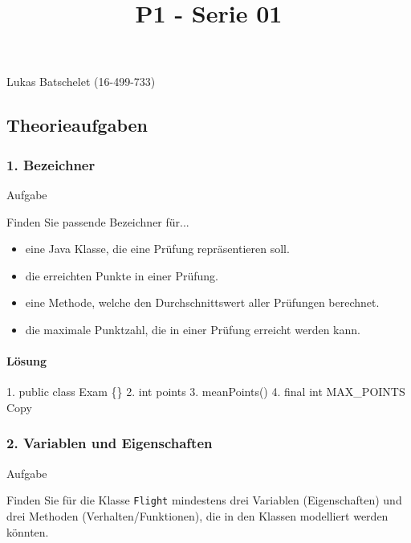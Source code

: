 \documentclass[
]{article}
\title{P1 - Serie 01}
\author{}
\date{}
\newenvironment{Shaded}{}{}
\newcommand{\NormalTok}[1]{#1}
\providecommand{\tightlist}{%
  \setlength{\itemsep}{0pt}\setlength{\parskip}{0pt}}
\begin{document}
\maketitle

Lukas Batschelet (16-499-733)

\subsection{Theorieaufgaben}\label{theorieaufgaben}

\subsubsection{1. Bezeichner}\label{bezeichner}

Aufgabe

Finden Sie passende Bezeichner für...

\begin{itemize}
\tightlist
\item
  eine Java Klasse, die eine Prüfung repräsentieren soll.
\item
  die erreichten Punkte in einer Prüfung.
\item
  eine Methode, welche den Durchschnittswert aller Prüfungen berechnet.
\item
  die maximale Punktzahl, die in einer Prüfung erreicht werden kann.
\end{itemize}

\paragraph{Lösung}\label{luxf6sung}

\begin{Shaded}
\begin{Highlighting}[]
\NormalTok{1. public class Exam \{\}}
\NormalTok{2. int points}
\NormalTok{3. meanPoints()}
\NormalTok{4. final int MAX\_POINTS}
\NormalTok{Copy}
\end{Highlighting}
\end{Shaded}

\subsubsection{2. Variablen und
Eigenschaften}\label{variablen-und-eigenschaften}

Aufgabe

Finden Sie für die Klasse \texttt{Flight} mindestens drei Variablen
(Eigenschaften) und drei Methoden (Verhalten/Funktionen), die in den
Klassen modelliert werden könnten.
\end{document}
